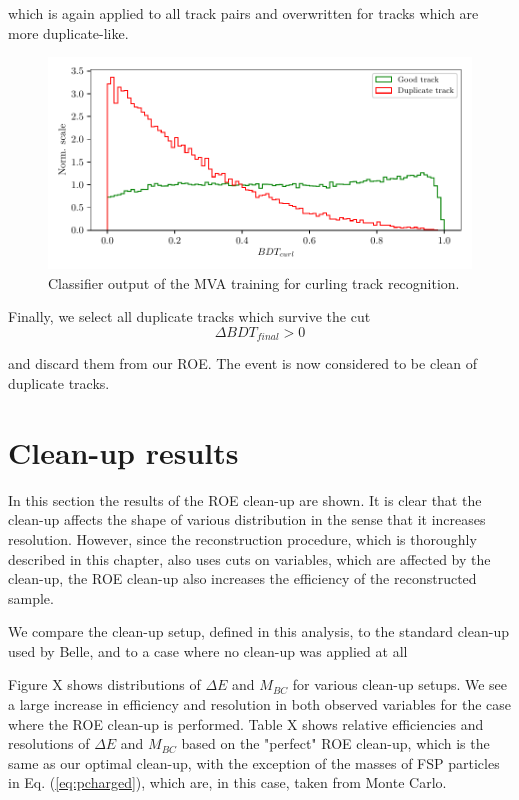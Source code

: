 \documentclass[oneside,a4paper,openany,12pt]{scrbook}
\begin{document}
which is again applied to all track pairs and overwritten for tracks which are more duplicate-like.

\begin{figure}[H]
\centering
\captionsetup{width=0.8\linewidth}
\includegraphics[width=\linewidth]{fig/ROECleanup_curl}
\caption{Classifier output of the MVA training for curling track recognition.}
\label{fig:ROE_curl}
\end{figure}

Finally, we select all duplicate tracks which survive the cut 
\begin{equation}
\Delta BDT_{final} > 0
\end{equation}

and discard them from our ROE. The event is now considered to be clean of duplicate tracks.

\section{Clean-up results}

In this section the results of the ROE clean-up are shown. It is clear that the clean-up affects the shape of various distribution in the sense that it increases resolution. However, since the reconstruction procedure, which is thoroughly described in this chapter, also uses cuts on variables, which are affected by the clean-up, the ROE clean-up also increases the efficiency of the reconstructed sample. 

We compare the clean-up setup, defined in this analysis, to the standard clean-up used by Belle, and to a case where no clean-up was applied at all

Figure X shows distributions of $\Delta E$ and $M_{BC}$ for various clean-up setups. We see a large increase in efficiency and resolution in both observed variables for the case where the ROE clean-up is performed. Table X shows relative efficiencies and resolutions of $\Delta E$ and $M_{BC}$ based on the "perfect" ROE clean-up, which is the same as our optimal clean-up, with the exception of the masses of FSP particles in Eq. (\ref{eq:pcharged}), which are, in this case, taken from Monte Carlo.
\end{document}
